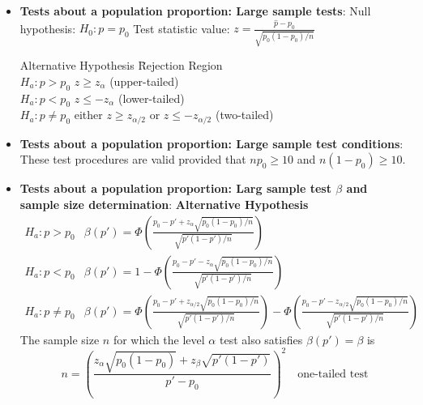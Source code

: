 \documentclass{report}
\begin{document}
\begin{itemize}
    \item \textbf{Tests about a population proportion: Large sample tests}:
        \bigbreak \noindent 
        Null hypothesis: $H_0: p = p_0$
        \bigbreak \noindent 
        Test statistic value: $z = \frac{\hat{p} - p_0}{\sqrt{p_0 (1 - p_0) / n}}$
        \bigbreak \noindent 
        \begin{tabbing}
            Alternative Hypothesis \hspace{2cm} \= Rejection Region \\
            $H_a: p > p_0$ \> $z \geq z_\alpha$ (upper-tailed) \\
            $H_a: p < p_0$ \> $z \leq -z_\alpha$ (lower-tailed) \\
            $H_a: p \neq p_0$ \> either $z \geq z_{\alpha/2}$ or $z \leq -z_{\alpha/2}$ (two-tailed) \\
        \end{tabbing}
        \bigbreak \noindent 
    \item \textbf{Tests about a population proportion: Large sample test conditions}: 
        These test procedures are valid provided that $np_0 \geq 10$ and $n(1 - p_0) \geq 10$.
        \item \textbf{Tests about a population proportion: Larg sample test $\beta$ and sample size determination}:
            \bigbreak \noindent 
            \textbf{Alternative Hypothesis}
            \bigbreak \noindent 
            \[
                \begin{array}{ll}
                    H_a: p > p_0 & \beta(p') = \Phi \left( \frac{p_0 - p' + z_\alpha \sqrt{p_0(1 - p_0)/n}}{\sqrt{p'(1 - p')/n}} \right) \\
                    H_a: p < p_0 & \beta(p') = 1 - \Phi \left( \frac{p_0 - p' - z_\alpha \sqrt{p_0(1 - p_0)/n}}{\sqrt{p'(1 - p')/n}} \right) \\
                    H_a: p \neq p_0 & \beta(p') = \Phi \left( \frac{p_0 - p' + z_{\alpha/2} \sqrt{p_0(1 - p_0)/n}}{\sqrt{p'(1 - p')/n}} \right) - \Phi \left( \frac{p_0 - p' - z_{\alpha/2} \sqrt{p_0(1 - p_0)/n}}{\sqrt{p'(1 - p')/n}} \right)
                \end{array}
            \]
            \bigbreak \noindent 
            The sample size \( n \) for which the level \( \alpha \) test also satisfies \( \beta(p') = \beta \) is
            \bigbreak \noindent 
            \[
                n = \left( \frac{z_\alpha \sqrt{p_0(1 - p_0)} + z_\beta \sqrt{p'(1 - p')}}{p' - p_0} \right)^2 \quad \text{one-tailed test}
            \]

\end{itemize}
\end{document}
